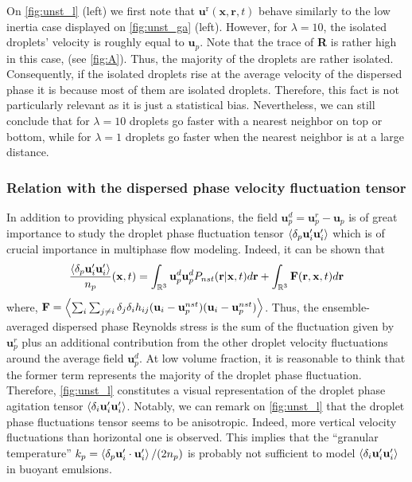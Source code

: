 On \ref{fig:unst_l} (left) we first note that $\textbf{u}^\text{r}(\textbf{x},\textbf{r},t)$ behave similarly to the low inertia case displayed on \ref{fig:unst_ga} (left).
However, for $\lambda = 10$, the isolated droplets' velocity is roughly equal to $\textbf{u}_p$. 
Note that the trace of \textbf{R} is rather high in this case, (see \ref{fig:A}). 
Thus, the majority of the droplets are rather isolated. 
Consequently, if the isolated droplets rise at the average velocity of the dispersed phase it is because most of them are isolated droplets.
Therefore, this fact is not particularly relevant as it is just a statistical bias. 
Nevertheless, we can still conclude that for $\lambda = 10$ droplets go faster with a nearest neighbor on top or bottom, while for  $\lambda = 1$ droplets go faster when the nearest neighbor is at a large distance. 

\subsubsection{Relation with the dispersed phase velocity fluctuation tensor}

In addition to providing physical explanations, the field $\textbf{u}_p^d = \textbf{u}^r_p - \textbf{u}_p$ is of great importance to study the droplet phase fluctuation tensor $\left<\delta_p \textbf{u}_i' \textbf{u}_i'\right>$ which is of crucial importance in multiphase flow modeling. 
Indeed, it can be shown that 
\begin{equation}
    \frac{\pavg{ \textbf{u}_i' \textbf{u}_i'}}{n_p}(\textbf{x},t)
    =  
    \int_{\mathbb{R}^3 }
    \textbf{u}_p^d
    \textbf{u}_p^d
    P_{nst}(\textbf{r}|\textbf{x},t)
    d\textbf{r}
    + \int_{\mathbb{R}^3 }
    \textbf{F}(\textbf{r},\textbf{x},t)
    d\textbf{r}
    \label{eq:particle_center_of_mass_velocities}
\end{equation}
where, $\textbf{F} = \left<\sum_i\sum_{j\neq i}\delta_j\delta_i h_{ij}(\textbf{u}_i - \textbf{u}_p^{nst})(\textbf{u}_i - \textbf{u}_p^{nst})\right>$. 
Thus, the ensemble-averaged dispersed phase Reynolds stress is the sum of the fluctuation given by $\textbf{u}_p^r$ plus an additional contribution from the other droplet velocity fluctuations around the average field $\textbf{u}_p^d$. 
At low volume fraction, it is reasonable to think that the former term represents the majority of the droplet phase fluctuation. 
Therefore, \ref{fig:unst_l} constitutes a visual representation of the droplet phase agitation tensor $\left<\delta_i \textbf{u}_i' \textbf{u}_i'\right>$. 
Notably, we can remark on \ref{fig:unst_l}  that the droplet phase fluctuations tensor seems to be anisotropic. 
Indeed, more vertical velocity fluctuations than horizontal one is observed. 
This implies that the ``granular temperature'' $k_p = \left<\delta_p  \textbf{u}_i' \cdot \textbf{u}_i'\right>/(2n_p)$ is probably not sufficient to model $\left<\delta_i \textbf{u}_i' \textbf{u}_i'\right>$ in buoyant emulsions. 

